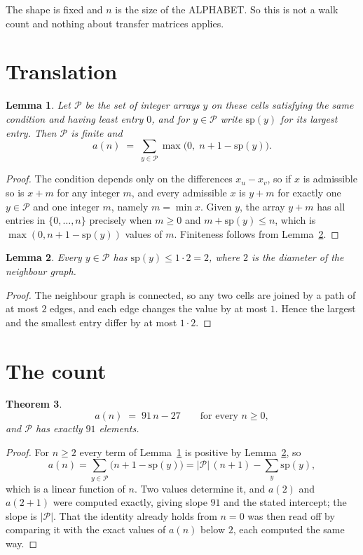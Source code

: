 \documentclass[11pt,a4paper]{article}
\theoremstyle{plain}
\newtheorem{theorem}{Theorem}
\newtheorem{lemma}[theorem]{Lemma}
\theoremstyle{definition}
\begin{document}
The shape is fixed and $n$ is the size of the ALPHABET. So this is not a walk count and
nothing about transfer matrices applies.

\section{Translation}

\begin{lemma}\label{lem:trans}
Let $\mathcal P$ be the set of integer arrays $y$ on these cells satisfying the same condition
and having least entry $0$, and for $y\in\mathcal P$ write $\mathrm{sp}(y)$ for its largest
entry. Then $\mathcal P$ is finite and
\[
a(n)\;=\;\sum_{y\in\mathcal P}\max\bigl(0,\;n+1-\mathrm{sp}(y)\bigr).
\]
\end{lemma}

\begin{proof}
The condition depends only on the differences $x_u-x_v$, so if $x$ is admissible so is $x+m$
for any integer $m$, and every admissible $x$ is $y+m$ for exactly one $y\in\mathcal P$ and one
integer $m$, namely $m=\min x$. Given $y$, the array $y+m$ has all entries in
$\{0,\dots,n\}$ precisely when $m\ge0$ and $m+\mathrm{sp}(y)\le n$, which is
$\max(0,n+1-\mathrm{sp}(y))$ values of $m$. Finiteness follows from
Lemma~\ref{lem:bound}.
\end{proof}

\begin{lemma}\label{lem:bound}
Every $y\in\mathcal P$ has $\mathrm{sp}(y)\le 1\cdot2=2$, where $2$ is the
diameter of the neighbour graph.
\end{lemma}

\begin{proof}
The neighbour graph is connected, so any two cells are joined by a path of at most $2$
edges, and each edge changes the value by at most $1$. Hence the largest and the smallest
entry differ by at most $1\cdot2$.
\end{proof}

\section{The count}

\begin{theorem}\label{thm:line}
\[
a(n)\;=\;91\,n-27\qquad\text{for every }n\ge0,
\]
and $\mathcal P$ has exactly $91$ elements.
\end{theorem}

\begin{proof}
For $n\ge2$ every term of Lemma~\ref{lem:trans} is positive by
Lemma~\ref{lem:bound}, so
\[
a(n)=\sum_{y\in\mathcal P}\bigl(n+1-\mathrm{sp}(y)\bigr)
=|\mathcal P|\,(n+1)-\sum_{y}\mathrm{sp}(y),
\]
which is a linear function of $n$. Two values determine it, and $a(2)$ and
$a(2+1)$ were computed exactly, giving slope $91$ and the stated intercept; the slope
is $|\mathcal P|$. That the identity already holds from $n=0$ was then read off by
comparing it with the exact values of $a(n)$ below $2$, each computed the same way.
\end{proof}
\end{document}
